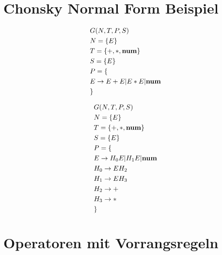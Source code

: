 \documentclass[t]{beamer}
\begin{document}
	\section{Chonsky Normal Form Beispiel}\label{sec:chonsky-normal-form-beispiel}
	\begin{frame}
		\begin{minipage}[c]{0.5\textwidth}
			\begin{align*}
				& G(N,T,P,S) \\
				& N= \{E\} \\
				& T= \{+, *, \bold{num}\} \\
				& S= \{E\}  \\
				& P = \{ \\
				& E \rightarrow E + E | E * E | \bold{num} \\
				& \}
			\end{align*}
		\end{minipage}\begin{minipage}[c]{0.5\textwidth}
			              \begin{align*}
				              & G(N,T,P,S) \\
				              & N= \{E\} \\
				              & T= \{+, *, \bold{num}\} \\
				              & S= \{E\}  \\
				              & P = \{ \\
				              & E \rightarrow H_0 E | H_1 E | \bold{num} \\
				              & H_0 \rightarrow E H_2 \\
				              & H_1 \rightarrow E H_3 \\
				              & H_2 \rightarrow + \\
				              & H_3 \rightarrow * \\
				              & \}
			              \end{align*}
		\end{minipage}
	\end{frame}


	\section{Operatoren mit Vorrangsregeln}\label{sec:operatoren-mit-vorrangsregeln}
	\begin{frame}

	\end{frame}
\end{document}
